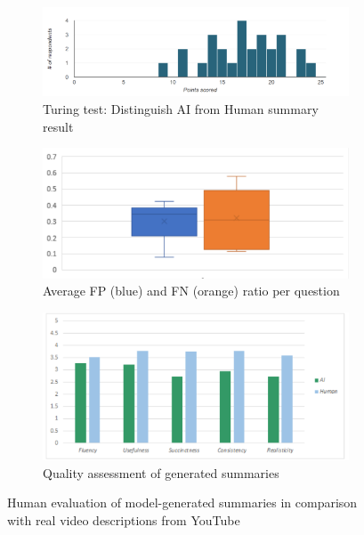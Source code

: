 \documentclass{article}
\begin{document}
\begin{figure}
\begin{subfigure}{.3\textwidth}
  \centering
  \includegraphics[width=\linewidth]{PointsScored.png}
  \caption{Turing test: Distinguish AI from Human summary result }
  \label{fig:scores}
\end{subfigure}
\begin{subfigure}{.3\textwidth}
  \centering
  \includegraphics[width=\linewidth]{BoxPlots.png}
  \caption{Average FP (blue) and FN (orange) ratio per question}
  \label{fig:box}
\end{subfigure}
\begin{subfigure}{.3\textwidth}
  \centering
  \includegraphics[width=\linewidth]{scores.png}
  \caption{Quality assessment of generated summaries}
  \label{fig:quality}
\end{subfigure}
\caption{Human evaluation of model-generated summaries in comparison with real video descriptions from YouTube}
\label{fig:survey}
\end{figure}
\end{document}
